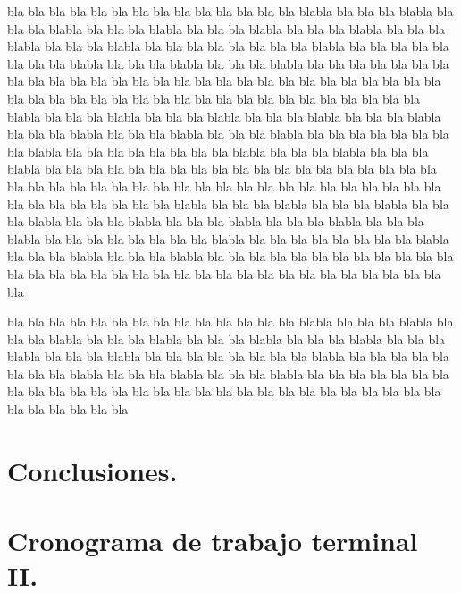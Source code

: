 \documentclass[11pt]{report}
\begin{document}
bla bla bla bla bla bla bla bla bla bla bla bla bla bla blabla bla bla bla blabla bla bla bla blabla bla bla bla blabla bla bla bla blabla bla bla bla blabla bla bla bla blabla bla bla bla blabla bla bla bla bla bla bla bla bla blabla bla bla bla bla bla bla bla bla blabla bla bla bla blabla bla bla bla blabla bla bla bla bla bla bla bla bla bla bla bla bla bla bla bla bla bla bla bla bla bla bla bla bla bla bla bla bla bla bla bla bla bla bla
bla bla bla bla bla bla bla bla bla bla bla bla bla bla blabla bla bla bla blabla bla bla bla blabla bla bla bla blabla bla bla bla blabla bla bla bla blabla bla bla bla blabla bla bla bla blabla bla bla bla bla bla bla bla bla blabla bla bla bla bla bla bla bla bla blabla bla bla bla blabla bla bla bla blabla bla bla bla bla bla bla bla bla bla bla bla bla bla bla bla bla bla bla bla bla bla bla bla bla bla bla bla bla bla bla bla bla bla bla
bla bla bla bla bla bla bla bla bla bla bla bla bla bla blabla bla bla bla blabla bla bla bla blabla bla bla bla blabla bla bla bla blabla bla bla bla blabla bla bla bla blabla bla bla bla blabla bla bla bla bla bla bla bla bla blabla bla bla bla bla bla bla bla bla blabla bla bla bla blabla bla bla bla blabla bla bla bla bla bla bla bla bla bla bla bla bla bla bla bla bla bla bla bla bla bla bla bla bla bla bla bla bla bla bla bla bla bla bla


bla bla bla bla bla bla bla bla bla bla bla bla bla bla blabla bla bla bla blabla bla bla bla blabla bla bla bla blabla bla bla bla blabla bla bla bla blabla bla bla bla blabla bla bla bla blabla bla bla bla bla bla bla bla bla blabla bla bla bla bla bla bla bla bla blabla bla bla bla blabla bla bla bla blabla bla bla bla bla bla bla bla bla bla bla bla bla bla bla bla bla bla bla bla bla bla bla bla bla bla bla bla bla bla bla bla bla bla bla


\section{Conclusiones.}

\section{Cronograma de trabajo terminal II.}


 
 


\appendix  
\clearpage %
\addappheadtotoc 
\appendixpage 
\end{document}
